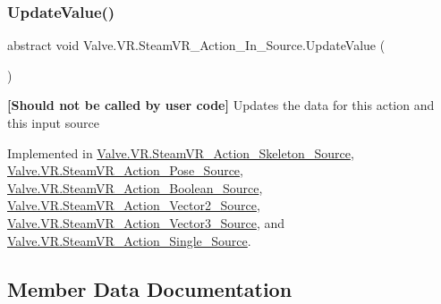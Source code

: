 \mbox{\label{class_valve_1_1_v_r_1_1_steam_v_r___action___in___source_a800b521715c6cbfe32e9b0b6db7e0a16}} 
\subsubsection{\texorpdfstring{UpdateValue()}{UpdateValue()}}
{\footnotesize\ttfamily abstract void Valve.\+V\+R.\+Steam\+V\+R\+\_\+\+Action\+\_\+\+In\+\_\+\+Source.\+Update\+Value (\begin{DoxyParamCaption}{ }\end{DoxyParamCaption})\hspace{0.3cm}{\ttfamily [pure virtual]}}



{\bfseries{\mbox{[}Should not be called by user code\mbox{]}}} Updates the data for this action and this input source 



Implemented in \mbox{\hyperlink{class_valve_1_1_v_r_1_1_steam_v_r___action___skeleton___source_ab6af87a8b749735903ba744c168f7baa}{Valve.\+V\+R.\+Steam\+V\+R\+\_\+\+Action\+\_\+\+Skeleton\+\_\+\+Source}}, \mbox{\hyperlink{class_valve_1_1_v_r_1_1_steam_v_r___action___pose___source_a2b299c57d8709519f9dfb91da28bde4e}{Valve.\+V\+R.\+Steam\+V\+R\+\_\+\+Action\+\_\+\+Pose\+\_\+\+Source}}, \mbox{\hyperlink{class_valve_1_1_v_r_1_1_steam_v_r___action___boolean___source_a3a48e22c9912f24ad65e3b64a21cc54c}{Valve.\+V\+R.\+Steam\+V\+R\+\_\+\+Action\+\_\+\+Boolean\+\_\+\+Source}}, \mbox{\hyperlink{class_valve_1_1_v_r_1_1_steam_v_r___action___vector2___source_a5bfd4e989ac2e24bc474506d4312dafa}{Valve.\+V\+R.\+Steam\+V\+R\+\_\+\+Action\+\_\+\+Vector2\+\_\+\+Source}}, \mbox{\hyperlink{class_valve_1_1_v_r_1_1_steam_v_r___action___vector3___source_aa88dba41707be49a5e0c2fa69447aab6}{Valve.\+V\+R.\+Steam\+V\+R\+\_\+\+Action\+\_\+\+Vector3\+\_\+\+Source}}, and \mbox{\hyperlink{class_valve_1_1_v_r_1_1_steam_v_r___action___single___source_a9b567d59d3f01262b3da646223016c99}{Valve.\+V\+R.\+Steam\+V\+R\+\_\+\+Action\+\_\+\+Single\+\_\+\+Source}}.



\subsection{Member Data Documentation}
\mbox{\label{class_valve_1_1_v_r_1_1_steam_v_r___action___in___source_aa4f8d3bdc1f308d2687e52f56b4c4dfe}} 
